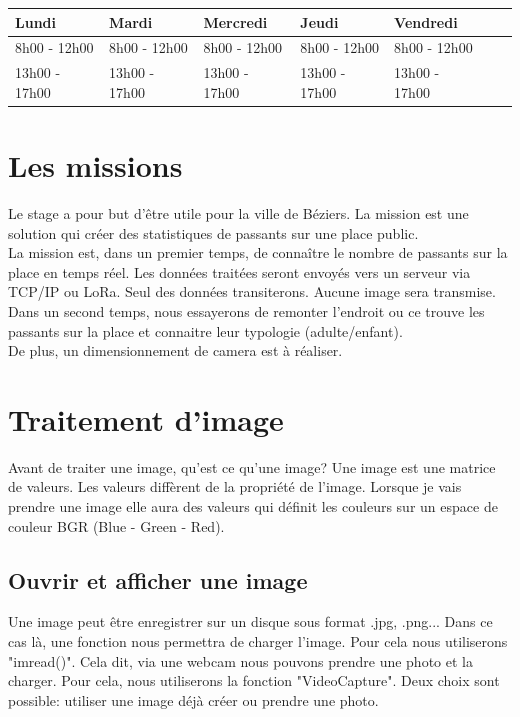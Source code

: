 \documentclass[12pt, french]{report}
\begin{document}
\begin{center}
        \begin{tabular}{|l|l|l|l|l|c|r|}
                \hline
                Lundi & Mardi & Mercredi & Jeudi & Vendredi \\
                \hline
                8h00 - 12h00 & 8h00 - 12h00 & 8h00 - 12h00 & 8h00 - 12h00 & 8h00 - 12h00 \\
                13h00 - 17h00 & 13h00 - 17h00 & 13h00 - 17h00 & 13h00 - 17h00 & 13h00 - 17h00 \\ 
                \hline
        \end{tabular}
\end{center}
\newpage

\section{Les missions}


Le stage a pour but d'être utile pour la ville de Béziers. La mission est une solution qui créer des statistiques de passants sur une place public. \\

La mission est, dans un premier temps, de connaître le nombre de passants sur la place en temps réel. Les données traitées seront envoyés vers un serveur via TCP/IP ou LoRa. Seul des données transiterons. Aucune image sera transmise.\\ 

Dans un second temps, nous essayerons de remonter l'endroit ou ce trouve les passants sur la place et connaitre leur typologie (adulte/enfant).\\

De plus, un dimensionnement de camera est à réaliser.
\newpage
\strut									      %
\newpage							              %
\newpage

\section{Traitement d'image}
Avant de traiter une image, qu'est ce qu'une image? Une image est une matrice de valeurs. Les valeurs diffèrent de la propriété de l'image. Lorsque je vais prendre une image elle aura des valeurs qui définit les couleurs sur un espace de couleur BGR (Blue - Green - Red).

        \subsection{Ouvrir et afficher une image}
                Une image peut être enregistrer sur un disque sous format .jpg, .png... Dans ce cas là, une fonction nous permettra de charger l'image. Pour cela nous utiliserons "imread()". Cela dit, via une webcam nous pouvons prendre une photo et la charger. Pour cela, nous utiliserons la fonction "VideoCapture". Deux choix sont possible: utiliser une image déjà créer ou prendre une photo.
\end{document}
